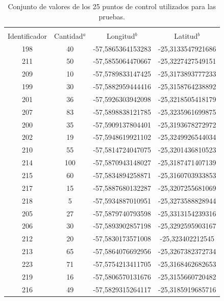 \begin{table}[!htpb]
    \begin{minipage}{\textwidth}
    \centering
        \caption{\label{tab:valores-puntos-control} Conjunto de valores de los 25 puntos de control utilizados para las pruebas.}
        \begin{tabular}{c c c c}
            \hline\\
            Identificador& Cantidad$^a$& Longitud$^b$ & Latitud$^b$\\
            \hline
            \hline
            198 & 40 & -57,5865364153283 & -25,3133547921686 \\
            211 & 50 & -57,5855064470667 & -25,3227427549151 \\
            209 & 10 & -57,5789833147425 & -25,3173893777233 \\
            199 & 30 & -57,5882959444416 & -25,3158764238892 \\
            201 & 36 & -57,5926303942098 & -25,3218505418179 \\
            207 & 83 & -57,5898838121785 & -25,3235961699875 \\
            200 & 35 & -57,5909137804401 & -25,3193678272972 \\
            202 & 19 & -57,5948619921102 & -25,3249926544034 \\
            210 & 55 & -57,5814724047075 & -25,3201436810523 \\
            214 & 100 & -57,5870943148027 & -25,3187471407139 \\
            215 & 60 & -57,5834894258871 & -25,3160703933853 \\
            217 & 15 & -57,5887680132287 & -25,3207255681069 \\
            218 & 5 & -57,5934887010951 & -25,3273588828944 \\
            205 & 27 & -57,5879740793598 & -25,3313154239316 \\
            206 & 30 & -57,5893902857198 & -25,3292595903167 \\
            212 & 20 & -57,5830173571008 & -25,323402212545 \\
            213 & 65 & -57,5864076692956 & -25,3267382372734 \\
            223 & 71 & -57,5754213411705 & -25,3168462682653 \\
            219 & 16 & -57,5806570131676 & -25,3155660720482 \\
            216 & 49 & -57,5829315264117 & -25,3185919685716 \\

\end{tabular}
\end{minipage}
\end{table}
